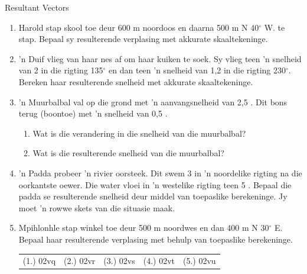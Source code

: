 \begin{exercises}{Resultant Vectors}{ \noindent\vspace{-1cm}
\begin{enumerate}[noitemsep, label=\textbf{\arabic*}.]
\item Harold stap skool toe deur 600 m noordoos en daarna 500 m N 40$^\circ$ W. te stap. Bepaal sy resulterende verplasing met akkurate skaaltekeninge.
\item  'n Duif vlieg van haar nes af om haar kuiken te soek. Sy vlieg teen  'n snelheid van 2 \ms in die rigting 135$^\circ$ en dan teen  'n snelheid van 1,2 \ms in die rigting 230$^\circ$. Bereken haar resulterende snelheid met akkurate skaaltekeninge.
\item  'n Muurbalbal val op die grond met  'n aanvangsnelheid van 2,5 \ms. Dit bons terug (boontoe) met  'n snelheid van 0,5 \ms. \begin{enumerate}
	\item Wat is die verandering in die snelheid van die muurbalbal?
	\item Wat is die resulterende snelheid van die muurbalbal?
	\end{enumerate}
\item  'n Padda probeer  'n rivier oorsteek. Dit swem 3 \ms in  'n noordelike rigting na die oorkantste oewer. Die water vloei in  'n westelike rigting teen 5 \ms. Bepaal die padda se resulterende snelheid deur middel van toepaslike berekeninge. Jy moet  'n rowwe skets van die situasie maak.
\item Mpihlonhle stap winkel toe deur 500 m noordwes en dan 400 m N 30$^\circ$ E. Bepaal haar resulterende verplasing met behulp van toepaslike berekeninge.
  \label{59e414b70efc194a27a122db47d06ce6**end}
\par \practiceinfo
 \par \begin{tabular}[h]{ccccc}
 (1.) 02vq  &  (2.) 02vr  &  (3.) 02vs &  (4.) 02vt  &  (5.) 02vu \end{tabular}
\end{enumerate}
}
\end{exercises}



